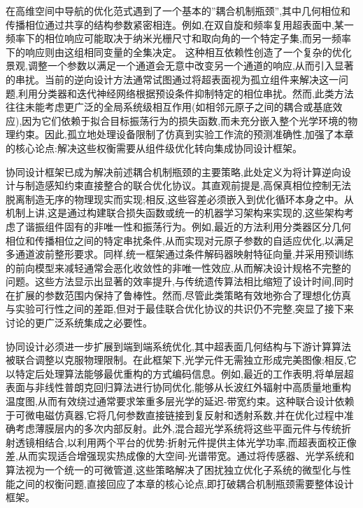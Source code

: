 \documentclass[11pt]{article}
\begin{document}
在高维空间中导航的优化范式遇到了一个基本的''耦合机制瓶颈'',其中几何相位和传播相位通过共享的结构参数紧密相连。例如,在双自旋和频率复用超表面中,某一频率下的相位响应可能取决于纳米光栅尺寸和取向角的一个特定子集,而另一频率下的响应则由这组相同变量的全集决定。\citep{doi_10_1117_1_apn_2_1_016010_57069347} \citep{doi_10_1002_advs_202504634_52bafb6c} 这种相互依赖性创造了一个复杂的优化景观,调整一个参数以满足一个通道会无意中改变另一个通道的响应,从而引入显著的串扰。当前的逆向设计方法通常试图通过将超表面视为孤立组件来解决这一问题,利用分类器和迭代神经网络根据预设条件抑制特定的相位串扰。然而,此类方法往往未能考虑更广泛的全局系统级相互作用(如相邻元原子之间的耦合或基底效应),因为它们依赖于拟合目标振荡行为的损失函数,而未充分嵌入整个光学环境的物理约束。因此,孤立地处理设备限制了仿真到实验工作流的预测准确性,加强了本章的核心论点:解决这些权衡需要从组件级优化转向集成协同设计框架。\citep{doi_10_1117_1_apn_2_1_016010_57069347} \citep{doi_10_1515_nanoph_2020_0379_1cc596ab}

协同设计框架已成为解决前述耦合机制瓶颈的主要策略,此处定义为将计算逆向设计与制造感知约束直接整合的联合优化协议。其直观前提是,高保真相位控制无法脱离制造无序的物理现实而实现;相反,这些容差必须嵌入到优化循环本身之中。从机制上讲,这是通过构建联合损失函数或统一的机器学习架构来实现的,这些架构考虑了谐振组件固有的非唯一性和振荡行为。例如,最近的方法利用分类器区分几何相位和传播相位之间的特定串扰条件,从而实现对元原子参数的自适应优化,以满足多通道波前整形要求。同样,统一框架通过条件解码器映射特征向量,并采用预训练的前向模型来减轻通常会恶化收敛性的非唯一性效应,从而解决设计规格不完整的问题。这些方法显示出显著的效率提升,与传统遗传算法相比缩短了设计时间,同时在扩展的参数范围内保持了鲁棒性。然而,尽管此类策略有效地弥合了理想化仿真与实验可行性之间的差距,但对于最佳联合优化协议的共识仍不完整,突显了接下来讨论的更广泛系统集成之必要性。\citep{doi_10_1117_1_apn_2_1_016010_57069347} \citep{doi_10_1515_nanoph_2020_0379_1cc596ab} \citep{doi_10_23919_piers_fall62445_2025_11394631_4fdb8517}

协同设计必须进一步扩展到端到端系统优化,其中超表面几何结构与下游计算算法被联合调整以克服物理限制。在此框架下,光学元件无需独立形成完美图像;相反,它以特定后处理算法能够最优重构的方式编码信息。例如,最近的工作表明,将单层超表面与非线性普朗克回归算法进行协同优化,能够从长波红外辐射中高质量地重构温度图,从而有效绕过通常要求笨重多层光学的延迟-带宽约束。这种联合设计依赖于可微电磁仿真器,它将几何参数直接链接到复反射和透射系数,并在优化过程中准确考虑薄膜层内的多次内部反射。此外,混合超光学系统将这些平面元件与传统折射透镜相结合,以利用两个平台的优势:折射元件提供主体光学功率,而超表面校正像差,从而实现适合增强现实热成像的大空间-光谱带宽。通过将传感器、光学系统和算法视为一个统一的可微管道,这些策略解决了困扰独立优化子系统的微型化与性能之间的权衡问题,直接回应了本章的核心论点,即打破耦合机制瓶颈需要整体设计框架。\citep{doi_10_1002_adom_202402498_4083d234} \citep{doi_10_1002_lpor_71431_d57da40c}
\end{document}

